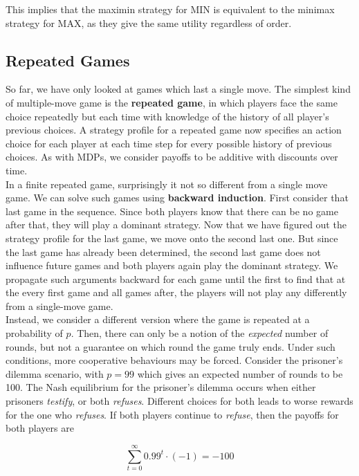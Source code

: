 \documentclass[11pt]{article}
\begin{document}
This implies that the maximin strategy for MIN is equivalent to the minimax strategy for MAX, as they give the same utility regardless of order. 

\subsection{Repeated Games}

So far, we have only looked at games which last a single move. The simplest kind of multiple-move game is the \textbf{repeated game}, in which players face the same choice repeatedly but each time with knowledge of the history of all player's previous choices. A strategy profile for a repeated game now specifies an action choice for each player at each time step for every possible history of previous choices. As with MDPs, we consider payoffs to be additive with discounts over time.\\

In a finite repeated game, surprisingly it not so different from a single move game. We can solve such games using \textbf{backward induction}. First consider that last game in the sequence. Since both players know that there can be no game after that, they will play a dominant strategy. Now that we have figured out the strategy profile for the last game, we move onto the second last one. But since the last game has already been determined, the second last game does not influence future games and both players again play the dominant strategy. We propagate such arguments backward for each game until the first to find that at the every first game and all games after, the players will not play any differently from a single-move game.\\

Instead, we consider a different version where the game is repeated at a probability of $p$. Then, there can only be a notion of the \textit{expected} number of rounds, but not a guarantee on which round the game truly ends. Under such conditions, more cooperative behaviours may be forced. Consider the prisoner's dilemma scenario, with $p=99$ which gives an expected number of rounds to be 100. The Nash equilibrium for the prisoner's dilemma occurs when either prisoners \textit{testify}, or both \textit{refuses}. Different choices for both leads to worse rewards for the one who \textit{refuses}. If both players continue to \textit{refuse}, then the payoffs for both players are

$$
\sum^{\infty}_{t=0} 0.99^t \cdot (-1) = -100
$$
\end{document}
